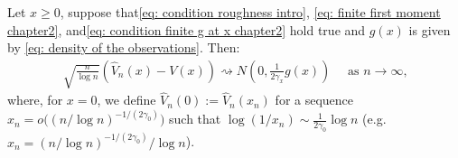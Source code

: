 \begin{theorem}\label{thm: normality Holder}
Let $x \geq 0$, suppose that\eqref{eq: condition roughness intro}, \eqref{eq: finite first moment chapter2}, and\eqref{eq: condition finite g at x chapter2} hold true and $g(x)$ is given by \eqref{eq: density of the observations}. Then:
\begin{align*}
    \sqrt{\frac{n}{\log n}}\left(\hat{V}_n(x)-V(x)\right) \rightsquigarrow N\left(0, \frac{1}{2 \gamma_x} g(x)\right) \quad \text { as } n \rightarrow \infty \text {,}
\end{align*}
where, for $x=0$, we define $\hat{V}_n(0) := \hat{V}_n(x_n)$ for a sequence $x_n = o\big((n/\log n)^{-1/(2\gamma_0)}\big)$ such that $\log(1/x_n) \sim \frac{1}{2\gamma_0}\log n$ (e.g.\ $x_n = (n/\log n)^{-1/(2\gamma_0)}/\log n$).
\end{theorem}
